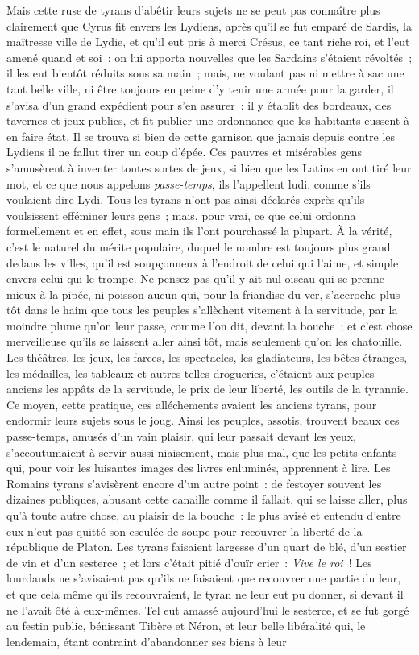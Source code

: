 \documentclass[french,twoside]{book} %
\begin{document}
\noindent Mais cette ruse de tyrans d’abêtir leurs sujets ne se peut pas connaître plus clairement que Cyrus fit envers les Lydiens, après qu’il se fut emparé de Sardis, la maîtresse ville de Lydie, et qu’il eut pris à merci Crésus, ce tant riche roi, et l’eut amené quand et soi : on lui apporta nouvelles que les Sardains s’étaient révoltés ; il les eut bientôt réduits sous sa main ; mais, ne voulant pas ni mettre à sac une tant belle ville, ni être toujours en peine d’y tenir une armée pour la garder, il s’avisa d’un grand expédient pour s’en assurer : il y établit des bordeaux, des tavernes et jeux publics, et fit publier une ordonnance que les habitants eussent à en faire état. Il se trouva si bien de cette garnison que jamais depuis contre les Lydiens il ne fallut tirer un coup d’épée. Ces pauvres et misérables gens s’amusèrent à inventer toutes sortes de jeux, si bien que les Latins en ont tiré leur mot, et ce que nous appelons \emph{passe-temps}, ils l’appellent ludi, comme s’ils voulaient dire Lydi. Tous les tyrans n’ont pas ainsi déclarés exprès qu’ils voulsissent efféminer leurs gens ; mais, pour vrai, ce que celui ordonna formellement et en effet, sous main ils l’ont pourchassé la plupart. À la vérité, c’est le naturel du mérite populaire, duquel le nombre est toujours plus grand dedans les villes, qu’il est soupçonneux à l’endroit de celui qui l’aime, et simple envers celui qui le trompe. Ne pensez pas qu’il y ait nul oiseau qui se prenne mieux à la pipée, ni poisson aucun qui, pour la friandise du ver, s’accroche plus tôt dans le haim que tous les peuples s’allèchent vitement à la servitude, par la moindre plume qu’on leur passe, comme l’on dit, devant la bouche ; et c’est chose merveilleuse qu’ils se laissent aller ainsi tôt, mais seulement qu’on les chatouille. Les théâtres, les jeux, les farces, les spectacles, les gladiateurs, les bêtes étranges, les médailles, les tableaux et autres telles drogueries, c’étaient aux peuples anciens les appâts de la servitude, le prix de leur liberté, les outils de la tyrannie. Ce moyen, cette pratique, ces alléchements avaient les anciens tyrans, pour endormir leurs sujets sous le joug. Ainsi les peuples, assotis, trouvent beaux ces passe-temps, amusés d’un vain plaisir, qui leur passait devant les yeux, s’accoutumaient à servir aussi niaisement, mais plus mal, que les petits enfants qui, pour voir les luisantes images des livres enluminés, apprennent à lire. Les Romains tyrans s’avisèrent encore d’un autre point : de festoyer souvent les dizaines publiques, abusant cette canaille comme il fallait, qui se laisse aller, plus qu’à toute autre chose, au plaisir de la bouche : le plus avisé et entendu d’entre eux n’eut pas quitté son esculée de soupe pour recouvrer la liberté de la république de Platon. Les tyrans faisaient largesse d’un quart de blé, d’un sestier de vin et d’un sesterce ; et lors c’était pitié d’ouïr crier : \emph{Vive le roi} ! Les lourdauds ne s’avisaient pas qu’ils ne faisaient que recouvrer une partie du leur, et que cela même qu’ils recouvraient, le tyran ne leur eut pu donner, si devant il ne l’avait ôté à eux-mêmes. Tel eut amassé aujourd’hui le sesterce, et se fut gorgé au festin public, bénissant Tibère et Néron, et leur belle libéralité qui, le lendemain, étant contraint d’abandonner ses biens à leur 
\end{document}
